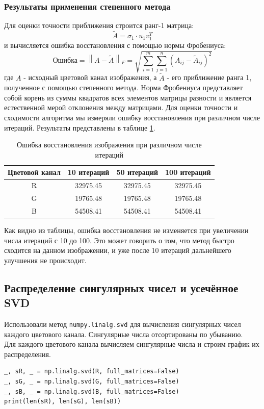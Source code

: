 \documentclass[a4paper,12pt]{article}
\begin{document}
\subsubsection*{Результаты применения степенного метода}

Для оценки точности приближения строится ранг-1 матрица:
$$
\tilde{A} = \sigma_1 \cdot u_1 v_1^T
$$
и вычисляется ошибка восстановления с помощью нормы Фробениуса:
$$
\text{Ошибка} = \left\| A - \tilde{A} \right\|_F = \sqrt{\sum_{i=1}^{m}\sum_{j=1}^{n} \left(A_{ij} - \tilde{A}_{ij}\right)^2}
$$
где $A$ - исходный цветовой канал изображения, а $\tilde{A}$ - его приближение ранга 1, полученное с помощью степенного метода. Норма Фробениуса представляет собой корень из суммы квадратов всех элементов матрицы разности и является естественной мерой отклонения между матрицами.
Для оценки точности и сходимости алгоритма мы измеряли ошибку восстановления при различном числе итераций. Результаты представлены в таблице \ref{tab:power_method_error}.

\begin{table}[h]
\centering
\begin{tabular}{|c|c|c|c|}
\hline
\textbf{Цветовой канал} & \textbf{10 итераций} & \textbf{50 итераций} & \textbf{100 итераций} \\
\hline
R & 32975.45 & 32975.45 & 32975.45 \\
\hline
G & 19765.48 & 19765.48 & 19765.48 \\
\hline
B & 54508.41 & 54508.41 & 54508.41 \\
\hline
\end{tabular}
\caption{Ошибка восстановления изображения при различном числе итераций}
\label{tab:power_method_error}
\end{table}

Как видно из таблицы, ошибка восстановления не изменяется при увеличении числа итераций с 10 до 100. Это может говорить о том, что метод быстро сходится на данном изображении, и уже после 10 итераций дальнейшего улучшения не происходит.

\subsection{Распределение сингулярных чисел и усечённое SVD}
Использовали метод \verb|numpy.linalg.svd| для вычисления сингулярных чисел каждого цветового канала. Сингулярные числа отсортированы по убыванию.\\
Для каждого цветового канала вычисляем сингулярные числа и строим график их распределения.\\
\begin{verbatim}
_, sR, _ = np.linalg.svd(R, full_matrices=False)
_, sG, _ = np.linalg.svd(G, full_matrices=False)
_, sB, _ = np.linalg.svd(B, full_matrices=False)
print(len(sR), len(sG), len(sB))  
\end{verbatim}
\end{document}
